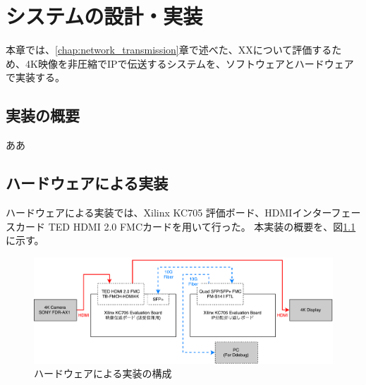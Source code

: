 \chapter{システムの設計・実装}
\label{chap:implementation}

本章では、\ref{chap:network_transmission}章で述べた、XXについて評価するため、4K映像を非圧縮でIPで伝送するシステムを、ソフトウェアとハードウェアで実装する。



\section{実装の概要}

ああ

\section{ハードウェアによる実装}

ハードウェアによる実装では、Xilinx KC705 評価ボード、HDMIインターフェースカード TED HDMI 2.0 FMCカードを用いて行った。
本実装の概要を、図\ref{fig:fpga-implement-flow}に示す。

\begin{figure}[htbp]
    \begin{center}
        \includegraphics[bb=0 0 841 299,width=15.5cm]{img/fpga-implement-flow.pdf}
    \end{center}
    \caption{ハードウェアによる実装の構成}
    \label{fig:fpga-implement-flow}
\end{figure}

